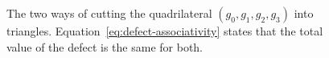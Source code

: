 \begin{figure}[ht]
	\centering
	\caption{The two ways of cutting the quadrilateral $(g_0,g_1,g_2,g_3)$ into triangles. Equation~\eqref{eq:defect-associativity} states that the total value of the defect is the same for both.}
	\label{fig:quadrilateral}
\end{figure}

